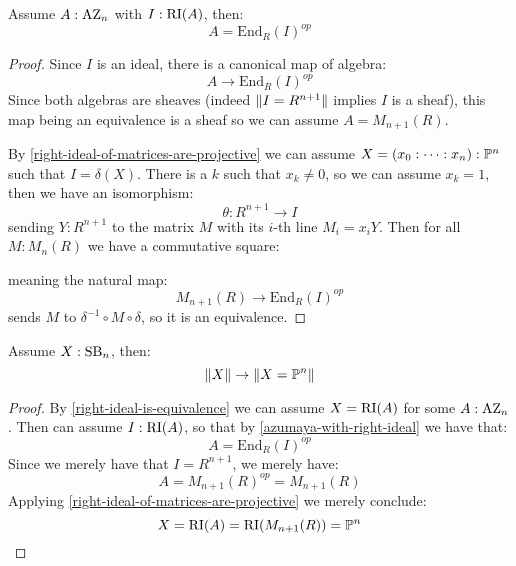 
\begin{lemma}\label{azumaya-with-right-ideal}
Assume $A:\mathrm{AZ}_n$ with $I:\mathrm{RI}(A)$, then:
\[A = \mathrm{End}_R(I)^{op}\]
\end{lemma}

\begin{proof}
Since $I$ is an ideal, there is a canonical map of algebra:
\[A \to\mathrm{End}_R(I)^{op}\]
Since both algebras are sheaves (indeed $\lVert I=R^{n+1} \rVert$ implies $I$ is a sheaf), this map being an equivalence is a sheaf so we can assume $A=M_{n+1}(R)$.

By \cref{right-ideal-of-matrices-are-projective} we can assume $X=(x_0:\cdots:x_n):\mathbb{P}^n$ such that $I=\delta(X)$. There is a $k$ such that $x_k\not=0$, so we can assume $x_k=1$, then we have an isomorphism:
\[\theta:R^{n+1}\to I\]
sending $Y:R^{n+1}$ to the matrix $M$ with its $i$-th line $M_i=x_iY$. Then for all $M:M_n(R)$ we have a commutative square:
\begin{center}
\end{center}
meaning the natural map:
\[ M_{n+1}(R)\to \mathrm{End}_R(I)^{op}\]
sends $M$ to $\delta^{-1}\circ M\circ\delta$, so it is an equivalence.
\end{proof}



\begin{theorem}
Assume $X:\mathrm{SB}_n$, then:
\[\lVert X \rVert\to\lVert X=\mathbb{P}^n \rVert\]
\end{theorem}

\begin{proof}
By \cref{right-ideal-is-equivalence} we can assume $X=\mathrm{RI}(A)$ for some $A:\mathrm{AZ}_n$. Then can assume $I:\mathrm{RI}(A)$, so that by \cref{azumaya-with-right-ideal} we have that:
\[A=\mathrm{End}_R(I)^{op}\]
Since we merely have that $I=R^{n+1}$, we merely have:
\[A = M_{n+1}(R)^{op} = M_{n+1}(R)\]
Applying \cref{right-ideal-of-matrices-are-projective} we merely conclude:
\[X=\mathrm{RI}(A)=\mathrm{RI}(M_{n+1}(R)) = \mathbb{P}^n\]
\end{proof}